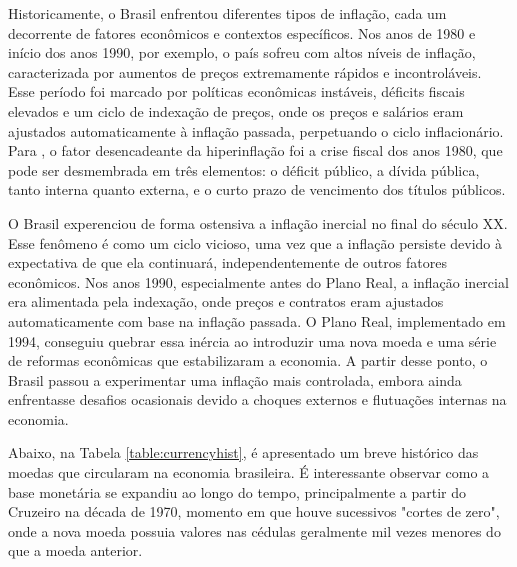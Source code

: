 \documentclass[12pt,oneside,a4paper,chapter=TITLE,english,brazil,sumario=abnt-6027-2012]{abntex2}
\begin{document}
Historicamente, o Brasil enfrentou diferentes tipos de inflação, cada um decorrente de fatores econômicos e contextos específicos. Nos anos de 1980 e início dos anos 1990, por exemplo, o país sofreu com altos níveis de inflação, caracterizada por aumentos de preços extremamente rápidos e incontroláveis. Esse período foi marcado por políticas econômicas instáveis, déficits fiscais elevados e um ciclo de indexação de preços, onde os preços e salários eram ajustados automaticamente à inflação passada, perpetuando o ciclo inflacionário. Para , o fator desencadeante da hiperinflação foi a crise fiscal dos anos 1980, que pode ser desmembrada em três elementos: o déficit público, a dívida pública, tanto interna quanto externa, e o curto prazo de vencimento dos títulos públicos.


O Brasil experenciou de forma ostensiva a inflação inercial no final do século XX. Esse fenômeno é como um ciclo vicioso, uma vez que a inflação persiste devido à expectativa de que ela continuará, independentemente de outros fatores econômicos. Nos anos 1990, especialmente antes do Plano Real, a inflação inercial era alimentada pela indexação, onde preços e contratos eram ajustados automaticamente com base na inflação passada. O Plano Real, implementado em 1994, conseguiu quebrar essa inércia ao introduzir uma nova moeda e uma série de reformas econômicas que estabilizaram a economia. A partir desse ponto, o Brasil passou a experimentar uma inflação mais controlada, embora ainda enfrentasse desafios ocasionais devido a choques externos e flutuações internas na economia.

Abaixo, na Tabela \ref{table:currencyhist}, é apresentado um breve histórico das moedas que circularam na economia brasileira. É interessante observar como a base monetária se expandiu ao longo do tempo, principalmente a partir do Cruzeiro na década de 1970, momento em que houve sucessivos "cortes de zero", onde a nova moeda possuia valores nas cédulas geralmente mil vezes menores do que a moeda anterior.

\vspace{0.2cm}
\end{document}
